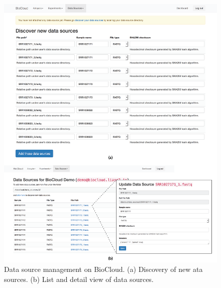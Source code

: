 \begin{figure}[!tbp]
\centering
\includegraphics[width=1\textwidth]{images/biocloud_data_source}
\caption[Data source management on BioCloud]{
    Data source management on BioCloud.
    (a) Discovery of new ata sources.
    (b) List and detail view of data sources.
}
\label{fig:biocloud-data-source}
\end{figure}

